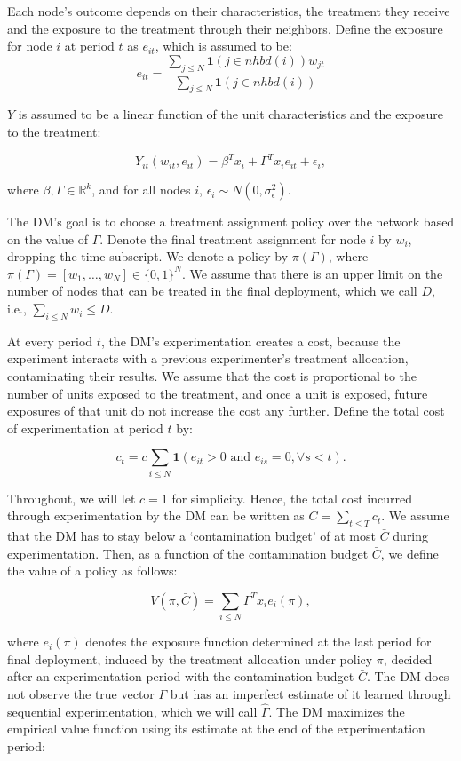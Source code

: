 \documentclass[11pt,a4paper]{article}
\begin{document}
Each node's outcome depends on their characteristics, the treatment they receive and the exposure to the treatment through their neighbors. Define the exposure for node $i$ at period $t$ as $e_{it}$, which is assumed to be: 
$$e_{it} = \frac { \sum_{j \leq N}  \mathbf{1}(j \in nhbd(i)) w_{jt}}{ \sum_{j \leq N} \mathbf{1}(j \in nhbd(i)) }$$

$Y$ is assumed to be a linear function of the unit characteristics and the exposure to the treatment:

$$Y_{it}( w_{it}, e_{it}) = \beta^T x_i + \Gamma^T x_i e_{it} + \epsilon_i,$$

where $\beta, \Gamma \in \mathbb{R}^k$, and for all nodes $i$, $\epsilon_i \sim N(0, \sigma^2_\epsilon)$.

 The DM's goal is to choose a treatment assignment policy over the network based on the value of $\Gamma$. Denote the final treatment assignment for node $i$ by $w_i$, dropping the time subscript. We denote a policy by $\pi(\Gamma)$, where $\pi(\Gamma)=[w_1, \dots , w_N] \in \{0,1\}^N$. We assume that there is an upper limit on the number of nodes that can be treated in the final deployment, which we call $D$, i.e., $\sum_{i \leq N} w_i \leq D$. 

At every period $t$, the DM's experimentation creates a cost, because the experiment interacts with a previous experimenter's treatment allocation, contaminating their results. We assume that the cost is proportional to the number of units exposed to the treatment, and once a unit is exposed, future exposures of that unit do not increase the cost any further. Define the total cost of experimentation at period $t$ by:

$$c_t = c \sum_{i \leq N} \mathbf{1}\left( e_{it} > 0 \mbox{ and } e_{is}=0,  \forall s<t \right) .$$

Throughout, we will let $c=1$ for simplicity. Hence, the total cost incurred through experimentation by the DM can be written as   $C= \sum_{t \leq T} c_t  .$ We assume that the DM has to stay below a `contamination budget' of at most $\bar{C}$ during experimentation. Then, as a function of the contamination budget $\bar{C}$, we define the value of a policy as follows:

$$V(\pi, \bar{C})=\sum_{i \leq N} \Gamma^T x_i e_i(\pi), $$

where $e_i(\pi)$ denotes the exposure function determined at the last period for final deployment, induced by the treatment allocation under policy $\pi$, decided after an experimentation period with the contamination budget $\bar{C}$. The DM does not observe the true vector $\Gamma$ but has an imperfect estimate of it learned through sequential experimentation, which we will call $\hat \Gamma$. The DM maximizes the empirical value function using its estimate at the end of the experimentation period:
\end{document}
